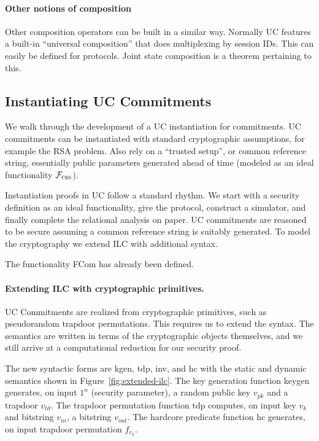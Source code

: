 
\paragraph{Other notions of composition}
Other composition operators can be built in a similar way.
Normally UC features a built-in ``universal composition'' that does multiplexing by  session IDs. This can easily be defined for protocols. 
Joint state composition is a theorem pertaining to this.


\subsection{Instantiating UC Commitments}
\label{subsec:example}
We walk through the development of a UC instantiation for commitments.  UC
commitments can be instantiated with standard cryptographic assumptions, for
example the RSA problem.  Also rely on a ``trusted setup'', or common reference
string, essentially public parameters generated ahead of time (modeled as an
ideal functionality $\mathcal{{F}}_{\textsc{crs}}$).

Instantiation proofs in UC follow a standard rhythm. We start with a security
definition as an ideal functionality, give the protocol, construct a simulator,
and finally complete the relational analysis on paper.  UC commitments are
reasoned to be secure assuming a common reference string is suitably generated.
To model the cryptography we extend ILC with additional syntax.

The functionality FCom has already been defined.

\paragraph{Extending ILC with cryptographic primitives.}
 UC Commitments are realized from
cryptographic primitives, such as pseudorandom trapdoor permutations. This
requires us to extend the syntax. The semantics are written in terms of the
cryptographic objects themselves, and we still arrive at a computational
reduction for our security proof.

The new syntactic forms are \textsf{kgen}, \textsf{tdp}, \textsf{inv}, and
\textsf{hc} with the static and dynamic semantics shown in
Figure~\ref{fig:extended-ilc}. The key generation function \textsf{keygen}
generates, on input $1^n$ (security parameter), a random public key $v_{pk}$ and
a trapdoor $v_{td}$. The trapdoor permutation function \textsf{tdp} computes, on
input key $v_k$ and bitstring $v_{in}$, a bitstring $v_{out}$. The hardcore
predicate function \textsf{hc} generates, on input trapdoor permutation
$f_{v_k}$.

